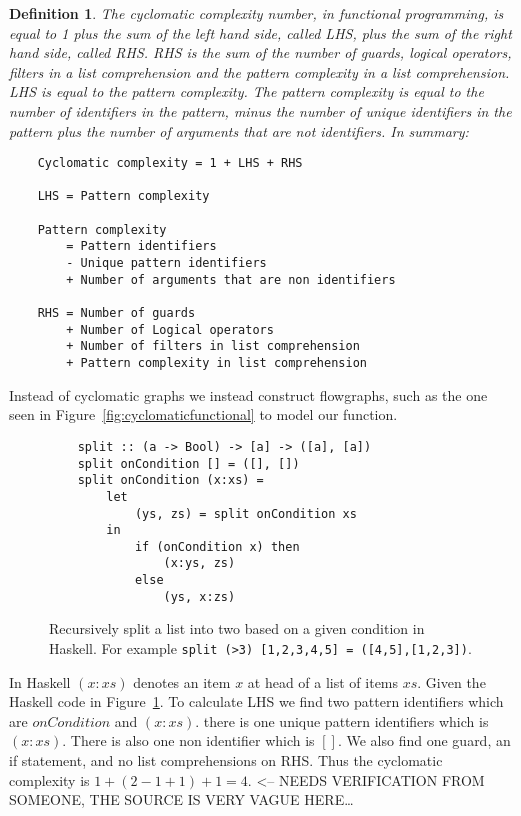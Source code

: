 \documentclass[12pt]{article}
\newtheorem*{definition}{Definition}
\theoremstyle{definition}
\theoremstyle{theorem}
\begin{document}
\theoremstyle{definition} 
    \begin{definition} 
    The cyclomatic complexity number, in functional programming, is equal to
    1 plus the sum of the left hand side, called LHS, plus the sum of the
    right hand side, called RHS. RHS is the sum of the number of guards,
    logical operators, filters in a list comprehension and the pattern
    complexity in a list comprehension. LHS is equal to the pattern
    complexity.  The pattern complexity is equal to the number of
    identifiers in the pattern, minus the number of unique identifiers in
    the pattern plus the number of arguments that are not identifiers. In
    summary:

    \begin{lstlisting}
    Cyclomatic complexity = 1 + LHS + RHS

    LHS = Pattern complexity 

    Pattern complexity   
        = Pattern identifiers 
        - Unique pattern identifiers 
        + Number of arguments that are non identifiers

    RHS = Number of guards 
        + Number of Logical operators 
        + Number of filters in list comprehension 
        + Pattern complexity in list comprehension
    \end{lstlisting}
\end{definition}

Instead of cyclomatic graphs we instead construct flowgraphs, such as the one
seen in Figure~\ref{fig:cyclomaticfunctional} to model our function.

\begin{figure}[H]
    \begin{lstlisting}
    split :: (a -> Bool) -> [a] -> ([a], [a])
    split onCondition [] = ([], [])
    split onCondition (x:xs) =
        let 
            (ys, zs) = split onCondition xs
        in 
            if (onCondition x) then 
                (x:ys, zs)
            else 
                (ys, x:zs)
    \end{lstlisting}
    \label{split}
    \caption{Recursively split a list into two based on a given condition in
    Haskell. For example \texttt{split (>3) [1,2,3,4,5] =
    ([4,5],[1,2,3])}.}
\end{figure}

In Haskell $(x:xs)$ denotes an item $x$ at head of a list of items $xs$. Given
the Haskell code in Figure~\ref{split}. To calculate LHS we find two
pattern identifiers which are $onCondition$ and $(x:xs)$. there is one unique
pattern identifiers which is $(x:xs)$. There is also one non identifier
which is $[]$. We also find one guard, an if statement, and no
list comprehensions on RHS. Thus the cyclomatic complexity is $1+(2-1+1)+1=4$.
<-- NEEDS VERIFICATION FROM SOMEONE, THE SOURCE IS VERY VAGUE HERE\ldots
\end{document}
